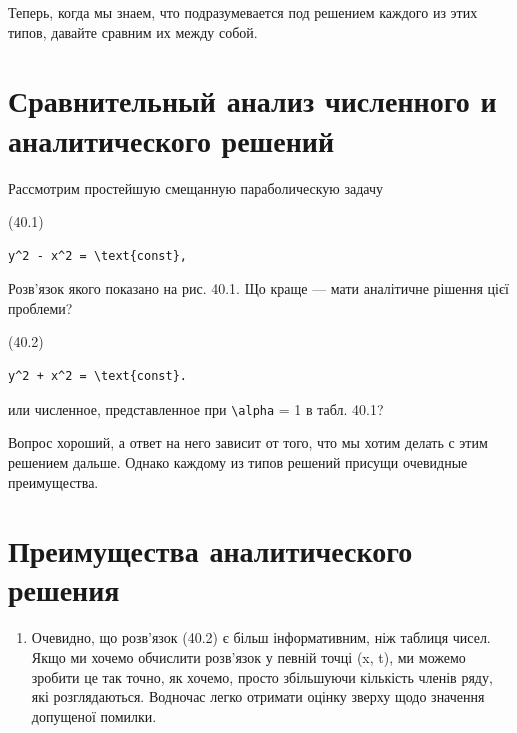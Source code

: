\documentclass[
  ukrainian,
]{article}
\providecommand{\tightlist}{%
  \setlength{\itemsep}{0pt}\setlength{\parskip}{0pt}}
\begin{document}
Теперь, когда мы знаем, что подразумевается под решением каждого из этих
типов, давайте сравним их между собой.

\section{\texorpdfstring{\textbf{Сравнительный анализ численного} и
аналитического
решений}{Сравнительный анализ численного и аналитического решений}}\label{ux441ux440ux430ux432ux43dux438ux442ux435ux43bux44cux43dux44bux439-ux430ux43dux430ux43bux438ux437-ux447ux438ux441ux43bux435ux43dux43dux43eux433ux43e-ux438-ux430ux43dux430ux43bux438ux442ux438ux447ux435ux441ux43aux43eux433ux43e-ux440ux435ux448ux435ux43dux438ux439}

Рассмотрим простейшую смещанную параболическую задачу

(40.1)

\begin{verbatim}
y^2 - x^2 = \text{const},
\end{verbatim}

Розв'язок якого показано на рис. 40.1. Що краще --- мати аналітичне
рішення цієї проблеми?

(40.2)

\begin{verbatim}
y^2 + x^2 = \text{const}.
\end{verbatim}

или численное, представленное при \texttt{\textbackslash{}alpha} = 1 в
табл. 40.1?

Вопрос хороший, а ответ на него зависит от того, что мы хотим делать с
этим решением дальше. Однако каждому из типов решений присущи очевидные
преимущества.

\section{Преимущества аналитического
решения}\label{ux43fux440ux435ux438ux43cux443ux449ux435ux441ux442ux432ux430-ux430ux43dux430ux43bux438ux442ux438ux447ux435ux441ux43aux43eux433ux43e-ux440ux435ux448ux435ux43dux438ux44f}

\begin{enumerate}
\def\labelenumi{\arabic{enumi}.}
\tightlist
\item
  Очевидно, що розв'язок (40.2) є більш інформативним, ніж таблиця
  чисел. Якщо ми хочемо обчислити розв'язок у певній точці (x, t), ми
  можемо зробити це так точно, як хочемо, просто збільшуючи кількість
  членів ряду, які розглядаються. Водночас легко отримати оцінку зверху
  щодо значення допущеної помилки.
\end{enumerate}
\end{document}
